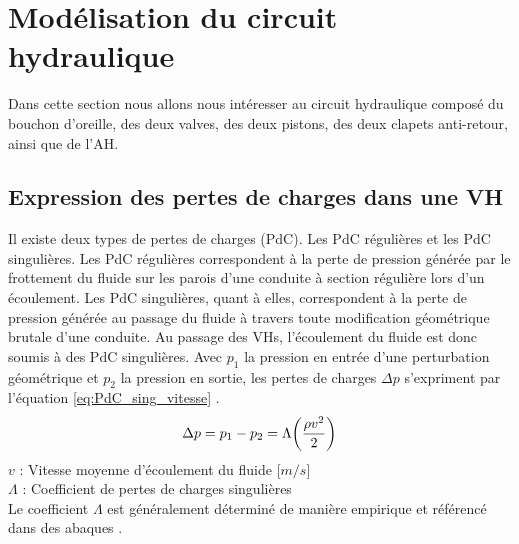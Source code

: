 \section{Modélisation du circuit hydraulique}
\label{sec:2.4_Modelisation du circuit hydraulique}
Dans cette section nous allons nous intéresser au circuit hydraulique composé du bouchon d'oreille, des deux valves, des deux pistons, des deux clapets anti-retour, ainsi que de l'AH. 
		\subsection{Expression des pertes de charges dans une VH}
		\label{sec:2.4.1_Expression des pertes de charges dans une VH}
Il existe deux types de pertes de charges (PdC). Les PdC régulières et les PdC singulières. Les PdC régulières correspondent à la perte de pression générée par le frottement du fluide sur les parois d'une conduite à section régulière lors d'un écoulement. Les PdC singulières, quant à elles, correspondent à la perte de pression générée au passage du fluide à travers toute modification géométrique brutale d'une conduite. Au passage des VHs, l'écoulement du fluide est donc soumis à des PdC singulières. Avec $p_1$ la pression en entrée d'une perturbation géométrique et $p_2$ la pression en sortie, les pertes de charges $\Delta p$ s'expriment par l'équation \ref{eq:PdC_sing_vitesse} \cite{Idelcik1986}.
\begin{equation}
\Delta p = p_1 - p_2 = \Lambda \biggl(\frac{{\rho} v^2}{2}\biggr)\\
\label{eq:PdC_sing_vitesse}
\end{equation}
$v$ : Vitesse moyenne d'écoulement du fluide [$m/s$]\\
$\Lambda$ : Coefficient de pertes de charges singulières\\

Le coefficient $\Lambda$ est généralement déterminé de manière empirique et référencé dans des abaques \cite{Idelcik1986,Giles2013}.

